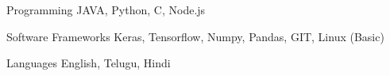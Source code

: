 

\begin{cvskills}




  \cvskill
    {Programming} %
    {JAVA, Python, C, Node.js} %

  \cvskill
    {Software Frameworks} %
    {Keras, Tensorflow, Numpy, Pandas, GIT, Linux (Basic)} %

  \cvskill
    {Languages} %
    {English, Telugu, Hindi} %

\end{cvskills}

